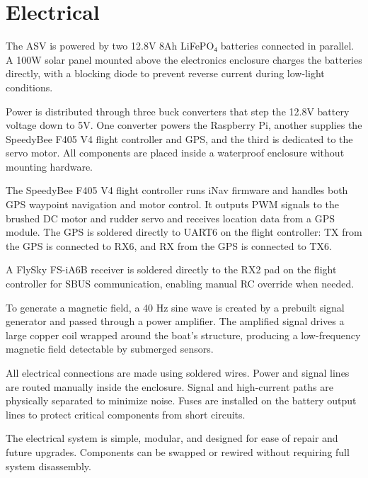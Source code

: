 \section{Electrical}

The ASV is powered by two 12.8V 8Ah LiFePO₄ batteries connected in parallel. A 100W solar panel mounted above the electronics enclosure charges the batteries directly, with a blocking diode to prevent reverse current during low-light conditions.

Power is distributed through three buck converters that step the 12.8V battery voltage down to 5V. One converter powers the Raspberry Pi, another supplies the SpeedyBee F405 V4 flight controller and GPS, and the third is dedicated to the servo motor. All components are placed inside a waterproof enclosure without mounting hardware.

The SpeedyBee F405 V4 flight controller runs iNav firmware and handles both GPS waypoint navigation and motor control. It outputs PWM signals to the brushed DC motor and rudder servo and receives location data from a GPS module. The GPS is soldered directly to UART6 on the flight controller: TX from the GPS is connected to RX6, and RX from the GPS is connected to TX6.

A FlySky FS-iA6B receiver is soldered directly to the RX2 pad on the flight controller for SBUS communication, enabling manual RC override when needed.

To generate a magnetic field, a 40 Hz sine wave is created by a prebuilt signal generator and passed through a power amplifier. The amplified signal drives a large copper coil wrapped around the boat’s structure, producing a low-frequency magnetic field detectable by submerged sensors.

All electrical connections are made using soldered wires. Power and signal lines are routed manually inside the enclosure. Signal and high-current paths are physically separated to minimize noise. Fuses are installed on the battery output lines to protect critical components from short circuits.

The electrical system is simple, modular, and designed for ease of repair and future upgrades. Components can be swapped or rewired without requiring full system disassembly.